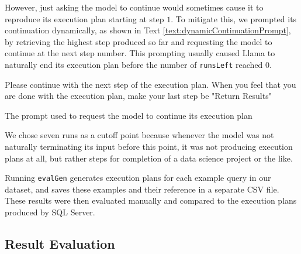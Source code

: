 However, just asking the model to continue would sometimes cause it to reproduce its execution plan starting at step $1$. To mitigate this, we prompted its continuation dynamically, as shown in Text \ref{text:dynamicContinuationPrompt}, by retrieving the highest step produced so far and requesting the model to continue at the next step number. This prompting usually caused Llama to naturally end its execution plan before the number of \lstinline{runsLeft} reached $0$.

\begin{text}
  Please continue with the next step of the execution plan. When you feel that you are done with the execution plan, make your last step be "Return Results"
  \caption{The prompt used to request the model to continue its execution plan}
  \label{text:dynamicContinuationPrompt}
\end{text}

We chose seven runs as a cutoff point because whenever the model was not naturally terminating its input before this point, it was not producing execution plans at all, but rather steps for completion of a data science project or the like.

Running \lstinline{evalGen} generates execution plans for each example query in our dataset, and saves these examples and their reference in a separate CSV file. These results were then evaluated manually and compared to the execution plans produced by SQL Server.

\subsection{Result Evaluation}

